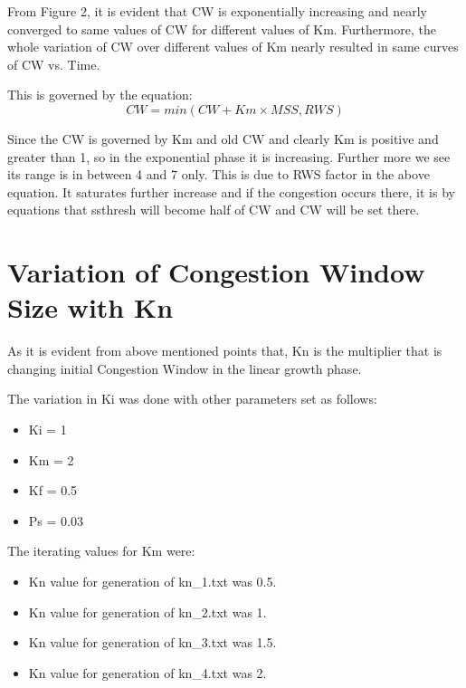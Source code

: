 \documentclass[12pt]{article}
\begin{document}
From Figure 2, it is evident that CW is exponentially increasing and nearly converged to same values of CW for different values of Km. Furthermore, the whole variation of CW over different values of Km nearly resulted in same curves of CW vs. Time.

This is governed by the equation:
\begin{equation*}
    CW = min(CW + Km \times MSS, RWS)
\end{equation*}

Since the CW is governed by Km and old CW and clearly Km is positive and greater than 1, so in the exponential phase it is increasing. Further more we see its range is in between 4 and 7 only. This is due to RWS factor in the above equation. It saturates further increase and if the congestion occurs there, it is by equations that ssthresh will become half of CW and CW will be set there.


\section{Variation of Congestion Window Size with Kn}
As it is evident from above mentioned points that, Kn is the multiplier that is changing initial Congestion Window in the linear growth phase.

The variation in Ki was done with other parameters set as follows:
\begin{itemize}
    \item Ki = 1
    \item Km = 2
    \item Kf = 0.5
    \item Ps = 0.03
\end{itemize}

The iterating values for Km were:
\begin{itemize}
    \item Kn value for generation of kn\_1.txt was 0.5.
    \item Kn value for generation of kn\_2.txt was 1.
    \item Kn value for generation of kn\_3.txt was 1.5.
    \item Kn value for generation of kn\_4.txt was 2.
\end{itemize}
\end{document}
